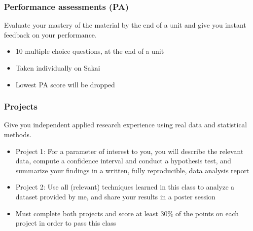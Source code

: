 \documentclass[11pt,containsverbatim,handout,xcolor=xelatex,dvipsnames,table]{beamer}
\begin{document}
\begin{frame}
\frametitle{Performance assessments (PA)}

 Evaluate your mastery of the material by the end of a unit and give 
you instant feedback on your performance.

\begin{itemize}

\item 10 multiple choice questions, at the end of a unit

\item Taken individually on Sakai

\item Lowest PA score will be dropped

\end{itemize}


\end{frame}


\begin{frame}
\frametitle{Projects}

 Give you independent applied research experience using real data and 
statistical methods.

\begin{itemize}

\item Project 1: For a parameter of interest to you, you will describe the relevant 
data, compute a confidence interval and conduct a hypothesis test, and summarize your 
findings in a written, fully reproducible, data analysis report

\item Project 2: Use all (relevant) techniques learned in this class to analyze a 
dataset provided by me, and share your results in a poster session

\item Must complete both projects and score at least 30\% of the points on each 
project in order to pass this class

\end{itemize}


\end{frame}
\end{document}
